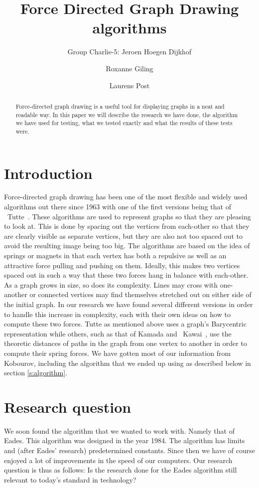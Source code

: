 \documentclass[a4paper,12pt,twoside]{article}
\begin{document}
\title{Force Directed Graph Drawing algorithms}
\author{Group Charlie-5: Jeroen Hoegen Dijkhof \and Roxanne Giling \and Laurens Post}
\maketitle
\begin{abstract}
Force-directed graph drawing is a useful tool for displaying graphs in a neat and readable way. In this paper we will describe the research we have done, the algorithm we have used for testing, what we tested exactly and what the results of these tests were.
\end{abstract}
\newpage

\section{Introduction}\label{s:Introduction}
Force-directed graph drawing has been one of the most flexible and widely used algorithms out there since 1963 with one of the first versions being that of ~Tutte~\cite{Tutte}. These algorithms are used to represent graphs so that they are pleasing to look at. This is done by spacing out the vertices from each-other so that they are clearly visible as separate vertices, but they are also not too spaced out to avoid the resulting image being too big. The algorithms are based on the idea of springs or magnets in that each vertex has both a repulsive as well as an attractive force pulling and pushing on them. Ideally, this makes two vertices spaced out in such a way that these two forces hang in balance with each-other. As a graph grows in size, so does its complexity. Lines may cross with one-another or connected vertices may find themselves stretched out on either side of the initial graph. In our research we have found several different versions in order to handle this increase in complexity, each with their own ideas on how to compute these two forces. Tutte as mentioned above uses a graph's Barycentric representation while others, such as that of Kamada and ~Kawai~\cite{Kawai}, use the theoretic distances of paths in the graph from one vertex to another in order to compute their spring forces. We have gotten most of our information from Kobourov\cite{Kobourov}, including the algorithm that we ended up using as described below in section \ref{s:algorithm}.

\section{Research question}
We soon found the algorithm that we wanted to work with. Namely that of Eades. This algorithm was designed in the year 1984. The algorithm has limits and (after Eades' research) predetermined constants. Since then we have of course enjoyed a lot of improvements in the speed of our computers. Our research question is thus as follows: Is the research done for the Eades algorithm still relevant to today's standard in technology?
\end{document}
